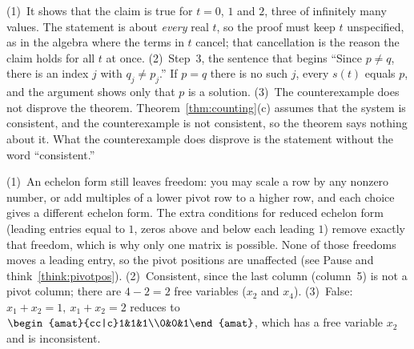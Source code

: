 \documentclass[11pt]{article}
\begin{document}
\begin{description}[leftmargin=0pt,itemsep=5pt]
  \item[Pause and think \ref{think:habits}.] (1)~It shows that the claim is true for $t=0$, $1$ and $2$, three of infinitely many values. The statement is about \emph{every} real $t$, so the proof must keep $t$ unspecified, as in the algebra where the terms in $t$ cancel; that cancellation is the reason the claim holds for all $t$ at once. (2)~Step~3, the sentence that begins ``Since $p\neq q$, there is an index $j$ with $q_j\neq p_j$.'' If $p=q$ there is no such $j$, every $s(t)$ equals $p$, and the argument shows only that $p$ is a solution. (3)~The counterexample does not disprove the theorem. Theorem~\ref{thm:counting}(c) assumes that the system is consistent, and the counterexample is not consistent, so the theorem says nothing about it. What the counterexample does disprove is the statement without the word ``consistent.''
  \item[Before the next section.] (1)~An echelon form still leaves freedom: you may scale a row by any nonzero
        number, or add multiples of a lower pivot row to a higher row, and each choice gives a different echelon
        form. The extra conditions for reduced echelon form (leading entries equal to $1$, zeros above and below
        each leading $1$) remove exactly that freedom, which is why only one matrix is possible. None of those
        freedoms moves a leading entry, so the pivot positions are unaffected (see
        Pause and think~\ref{think:pivotpos}). (2)~Consistent, since the last column (column~5) is not a pivot column; there are
        $4-2=2$ free variables ($x_2$ and $x_4$). (3)~False: $x_1+x_2=1,\ x_1+x_2=2$ reduces to
        $\begin{amat}{cc|c}1&1&1\\0&0&1\end{amat}$, which has a free variable $x_2$ and is inconsistent.
\end{description}
 
\end{document}
